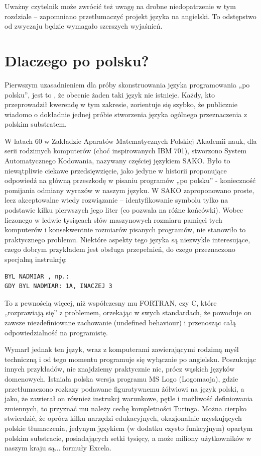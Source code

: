 Uważny czytelnik może zwrócić też uwagę na drobne niedopatrzenie w tym rozdziale – zapomniano  przetłumaczyć projekt języka na angielski. To odstępstwo od zwyczaju będzie wymagało szerszych wyjaśnień.

\section{Dlaczego po polsku?}
Pierwszym uzasadnieniem dla próby skonstruowania języka programowania „po polsku”, jest to , że obecnie żaden taki język nie istnieje. Każdy, kto przeprowadził kwerendę w tym zakresie, zorientuje się szybko, że publicznie wiadomo o dokładnie jednej próbie stworzenia języka ogólnego przeznaczenia z polskim substratem.

W latach 60 w Zakładzie Aparatów Matematycznych Polskiej Akademii nauk, dla serii rodzimych komputerów (choć inspirowanych IBM 701), stworzono System Automatycznego Kodowania, nazywany częściej językiem SAKO.\cite{SAKO} Było to niewątpliwie ciekawe przedsięwzięcie, jako jedyne w historii proponujące odpowiedź na główną przeszkodę w pisaniu programów „po polsku” - konieczność pomijania odmiany wyrazów w naszym języku. W SAKO zaproponowano proste, lecz akceptowalne wtedy rozwiązanie – identyfikowanie symbolu tylko na podstawie kilku pierwszych jego liter (co pozwala na różne końcówki). Wobec liczonego w ledwie tysiącach słów maszynowych rozmiaru pamięci tych komputerów i konsekwentnie rozmiarów pisanych programów, nie stanowiło to praktycznego problemu.
Niektóre aspekty tego języka są niezwykle interesujące, czego dobrym przykładem jest obsługa przepełnień, do czego przeznaczono specjalną instrukcję:
\begin{lstlisting}
BYL NADMIAR , np.:
GDY BYL NADMIAR: 1A, INACZEJ 3 
\end{lstlisting}
To z pewnością więcej, niż współczesny mu FORTRAN, czy C, które „rozprawiają się” z problemem, orzekając w swych standardach, że powoduje on zawsze niezdefiniowane zachowanie (undefined behaviour) i przenosząc całą odpowiedzialność na programistę.

Wymarł jednak ten język, wraz z komputerami zawierającymi rodzimą myśl techniczną i od tego momentu programuje się wyłącznie po angielsku.
Poszukując innych przykładów, nie znajdziemy praktycznie nic, prócz wąskich języków domenowych. Istniała polska wersja programu MS Logo (Logomaoja), gdzie przetłumaczono rozkazy podawane figuratywnemu żółwiowi na język polski, a jako, że zawierał on również instrukcj warunkowe, pętle i możliwość definiowania zmiennych, to przyznać mu należy cechę kompletności Turinga. Można cierpko stwierdzić, że oprócz kilku narzędzi edukacyjnych, okazjonalnie uzyskujących polskie tłumaczenia, jedynym językiem (w dodatku czysto funkcyjnym) opartym polskim substracie, posiadających setki tysięcy, a może miliony użytkowników w naszym kraju są... formuły Excela.

